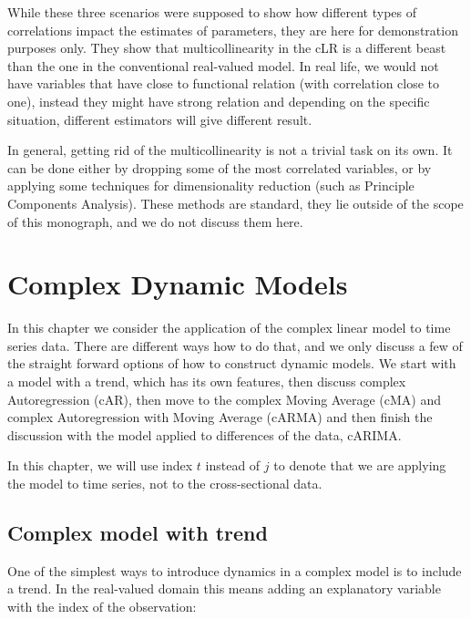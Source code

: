 \documentclass[
]{book}
\begin{document}
While these three scenarios were supposed to show how different types of correlations impact the estimates of parameters, they are here for demonstration purposes only. They show that multicollinearity in the cLR is a different beast than the one in the conventional real-valued model. In real life, we would not have variables that have close to functional relation (with correlation close to one), instead they might have strong relation and depending on the specific situation, different estimators will give different result.

In general, getting rid of the multicollinearity is not a trivial task on its own. It can be done either by dropping some of the most correlated variables, or by applying some techniques for dimensionality reduction (such as Principle Components Analysis). These methods are standard, they lie outside of the scope of this monograph, and we do not discuss them here.

\hypertarget{Dynamic}{%
\chapter{Complex Dynamic Models}\label{Dynamic}}

In this chapter we consider the application of the complex linear model to time series data. There are different ways how to do that, and we only discuss a few of the straight forward options of how to construct dynamic models. We start with a model with a trend, which has its own features, then discuss complex Autoregression (cAR), then move to the complex Moving Average (cMA) and complex Autoregression with Moving Average (cARMA) and then finish the discussion with the model applied to differences of the data, cARIMA.

In this chapter, we will use index \(t\) instead of \(j\) to denote that we are applying the model to time series, not to the cross-sectional data.

\hypertarget{DynamicTrend}{%
\section{Complex model with trend}\label{DynamicTrend}}

One of the simplest ways to introduce dynamics in a complex model is to include a trend. In the real-valued domain this means adding an explanatory variable with the index of the observation:
\end{document}
